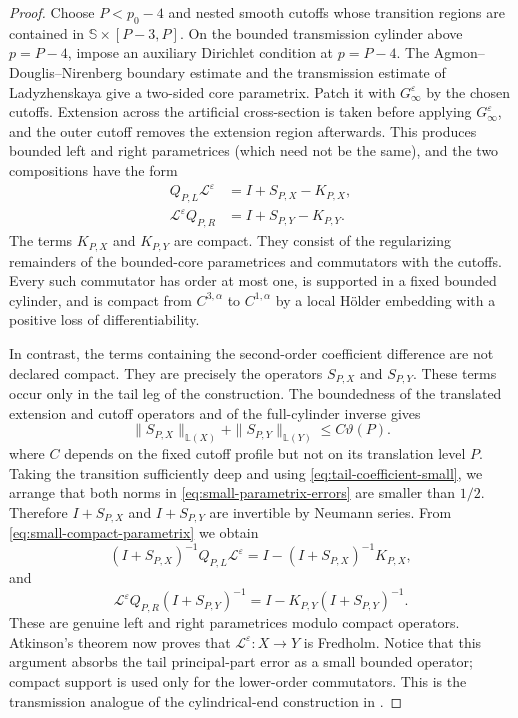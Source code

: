 \documentclass[11pt,reqno]{amsart}
\numberwithin{equation}{section}
\theoremstyle{definition}
\theoremstyle{remark}
\begin{document}
\begin{proof}
Choose $P<p_0-4$ and nested smooth cutoffs whose transition regions
are contained in $\mathbb S\times[P-3,P]$.  On the bounded
transmission cylinder above $p=P-4$, impose an auxiliary Dirichlet
condition at $p=P-4$.  The Agmon--Douglis--Nirenberg boundary
estimate and the transmission estimate of Ladyzhenskaya
\cite{Agmon,Lady} give a two-sided core parametrix.  Patch it with
$G_\infty^\varepsilon$ by the chosen cutoffs.  Extension across the
artificial cross-section is taken before applying
$G_\infty^\varepsilon$, and the outer cutoff removes the extension
region afterwards.  This produces bounded left and right
parametrices (which need not be the same), and the two compositions
have the form
\begin{equation}\label{eq:small-compact-parametrix}
 \begin{aligned}
  Q_{P,L}\mathcal L^\varepsilon
    &=I+S_{P,X}-K_{P,X},\\
  \mathcal L^\varepsilon Q_{P,R}
    &=I+S_{P,Y}-K_{P,Y}.
 \end{aligned}
\end{equation}
The terms $K_{P,X}$ and $K_{P,Y}$ are compact.  They consist of the
regularizing remainders of the bounded-core parametrices and
commutators with the cutoffs.  Every such commutator has order at
most one, is supported in a fixed bounded cylinder, and is compact
from $C^{3,\alpha}$ to $C^{1,\alpha}$ by a local H\"older embedding
with a positive loss of differentiability.

In contrast, the terms containing the second-order coefficient
difference are not declared compact.  They are precisely the
operators $S_{P,X}$ and $S_{P,Y}$.  These terms occur only in the
tail leg of the construction.  The boundedness of the translated
extension and cutoff operators and of the full-cylinder inverse gives
\begin{equation}\label{eq:small-parametrix-errors}
 \|S_{P,X}\|_{\mathbb L(X)}+
 \|S_{P,Y}\|_{\mathbb L(Y)}
 \leq C\vartheta(P).
\end{equation}
where $C$ depends on the fixed cutoff profile but not on its
translation level $P$.  Taking the transition sufficiently deep and using
\eqref{eq:tail-coefficient-small}, we arrange that both norms in
\eqref{eq:small-parametrix-errors} are smaller than $1/2$.  Therefore
$I+S_{P,X}$ and $I+S_{P,Y}$ are invertible by Neumann series.  From
\eqref{eq:small-compact-parametrix} we obtain
\[
 (I+S_{P,X})^{-1}Q_{P,L}\mathcal L^\varepsilon
  =I-(I+S_{P,X})^{-1}K_{P,X},
\]
and
\[
 \mathcal L^\varepsilon Q_{P,R}(I+S_{P,Y})^{-1}
  =I-K_{P,Y}(I+S_{P,Y})^{-1}.
\]
These are genuine left and right parametrices modulo compact
operators.  Atkinson's theorem now proves that
$\mathcal L^\varepsilon:X\to Y$ is Fredholm.  Notice that this
argument absorbs the tail principal-part error as a small bounded
operator; compact support is used only for the lower-order
commutators.  This is the transmission analogue of the
cylindrical-end construction in \cite[Lemma 3.1]{Hur11}.


\end{proof}
\end{document}
